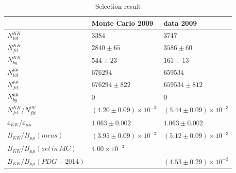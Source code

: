 \documentclass[a4paper,12pt]{article}
\begin{document}
\begin{table}
  \centering
  \label{tab:res09}
  \caption{Selection result}
  \begin{tabular}{lll} 
                          & Monte Carlo 2009 & data 2009      \\  \hline
  $ N_{tot}^{KK}$         & 3384             &    3747        \\            
  $ N_{fit}^{KK}$         & $2840\pm65$      &    $3586\pm60$ \\
  $ N_{bg}^{KK}$          & $544\pm23$       &          $161 \pm 13$   \\
  $ N_{tot}^{\mu\mu}$     & $676294$         &       659534   \\
  $ N_{fit}^{\mu\mu}$     & $676294\pm822$   &       $659534 \pm 812$   \\
  $ N_{bg}^{\mu\mu}$      & $0           $   &       0    \\
  $ N_{fit}^{KK}/N_{fit}^{\mu\mu}$& $(4.20 \pm 0.09)\times10^{-3} $ & $(5.44 \pm 0.09)\times 10^{-3}$  \\
  $\varepsilon_{KK}/\varepsilon_{\mu\mu}$ & $1.063 \pm 0.002$ &  $1.063 \pm 0.002$  \\
  $ B_{KK}/B_{\mu\mu}(meas)$   & $(3.95 \pm 0.09)\times 10^{-3}$  & $(5.12 \pm 0.09)\times 10^{-3}$ \\
  $ B_{KK}/B_{\mu\mu}(set\,  in\,  MC)$   & $4.00\times 10^{-3}$  &  	\\ 
  $ B_{KK}/B_{\mu\mu}(PDG-2014)$   &                  & $(4.53 \pm 0.29)\times 10^{-3}$
\end{tabular}
\end{table}
\end{document}
